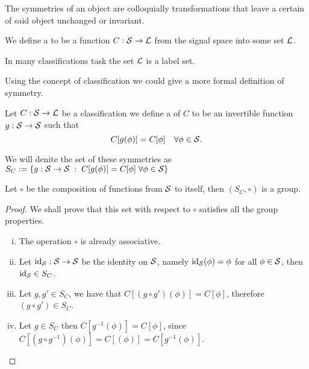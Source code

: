 \documentclass[../3.tex]{subfiles}
\begin{document}
    The symmetries of an object are colloquially transformations that leave
    a certain  of said object unchanged or invariant. 

    \begin{defn}
        We define a  to be a function $C : \mathcal{S} \to \mathcal{L}$ from the signal space into some set $\mathcal{L}$.
    \end{defn}

    In many classifications task the set $\mathcal{L}$ is a label set.

    Using the concept of classification we could give a more formal definition of symmetry.

    \begin{defn}
        Let $C : \mathcal{S} \to \mathcal{L}$ be a classification we define a  of $C$ to be an invertible function
        $g : \mathcal{S} \to \mathcal{S}$ such that 
        \[ C[g(\phi)] = C[\phi] \quad \forall \phi \in \mathcal{S}. \]
    \end{defn}

    We will denite the set of these symmetries as $S_C := \{ g : \mathcal{S} \to \mathcal{S} \; : \; C[g(\phi)] = C[\phi] \;  \forall \phi \in \mathcal{S}\}$

    \begin{prop}
        Let $\circ$ be the composition of functions from $\mathcal{S}$ to itself, then $(S_C, \circ)$ is a group.
    \end{prop} 
    \begin{proof}
        We shall prove that this set with respect to $\circ$ satisfies all the group properties.
        \begin{enumerate}[(i)]
            \item The operation $\circ$ is already associative.
            \item Let $\text{id}_{\mathcal{S}} : \mathcal{S} \to \mathcal{S}$ be the identity on $\mathcal{S}$, namely $\text{id}_{\mathcal{S}}(\phi) = \phi$ for all $\phi \in \mathcal{S}$,
                then $\text{id}_{\mathcal{S}} \in S_C$.
            \item Let $g,g' \in S_C$, we have that $C[(g\circ g')(\phi)] = C[\phi]$, therefore $(g \circ g') \in S_C$.
            \item Let $g \in S_C$ then $C[g^{-1}(\phi)] = C[\phi]$, since $C[(g \circ g^{-1})(\phi)] = C[(\phi)] = C[g^{-1}(\phi)]$. \qedhere
        \end{enumerate}
    \end{proof}
\end{document}

